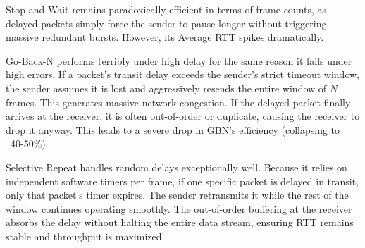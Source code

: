 \documentclass[12pt]{article}
\begin{document}
Stop-and-Wait remains paradoxically efficient in terms of frame counts, as delayed packets simply force the sender to pause longer without triggering massive redundant bursts. However, its Average RTT spikes dramatically. 

Go-Back-N performs terribly under high delay for the same reason it fails under high errors. If a packet's transit delay exceeds the sender's strict timeout window, the sender assumes it is lost and aggressively resends the entire window of $N$ frames. This generates massive network congestion. If the delayed packet finally arrives at the receiver, it is often out-of-order or duplicate, causing the receiver to drop it anyway. This leads to a severe drop in GBN's efficiency (collapsing to ~40-50\%).

Selective Repeat handles random delays exceptionally well. Because it relies on independent software timers per frame, if one specific packet is delayed in transit, only that packet's timer expires. The sender retransmits it while the rest of the window continues operating smoothly. The out-of-order buffering at the receiver absorbs the delay without halting the entire data stream, ensuring RTT remains stable and throughput is maximized.

\begin{table}[H]
\centering
{}
\caption{Efficiency and Avg RTT under varying Delay Probabilities}
\end{table}
\end{document}
